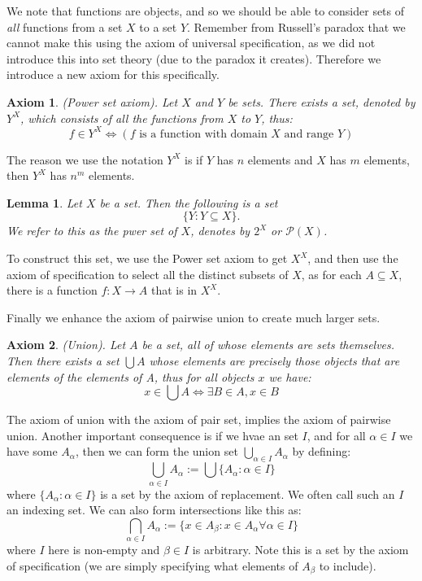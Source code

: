 \documentclass{article}
\newtheorem{axiom}{Axiom}[section]
\newtheorem{lemma}{Lemma}[subsection]
\let\it\textit
\begin{document}
We note that functions are objects, and so we should be able to consider 
sets of \it{all} functions from a set $X$ to a set $Y$. Remember 
from Russell's paradox that we cannot make this using the axiom 
of universal specification, as we did not introduce this into 
set theory (due to the paradox it creates). Therefore we introduce 
a new axiom for this specifically. 

\begin{axiom}
	(Power set axiom). Let $X$ and $Y$ be sets. There exists a set, 
	denoted by $Y^X$, which consists of all the functions from 
	$X$ to $Y$, thus: 
	$$
	f \in Y^X \iff (f \text{ is a function with domain } X 
	\text{ and range } Y)
	$$
\end{axiom}

The reason we use the notation $Y^X$ is if $Y$ has $n$ elements and $X$ has 
$m$ elements, then $Y^X$ has $n^m$ elements.

\begin{lemma}
	Let $X$ be a set. Then the following is a set 
	$$
	\{Y : Y \subseteq X \}.
	$$
	We refer to this as the pwer set of $X$, denotes by 
	$2^X$ or $\mathcal{P}(X)$.
\end{lemma}

To construct this set, we use the Power set axiom to get $X^X$, and then
use the axiom of specification to select all the distinct subsets of $X$, 
as for each $A \subseteq X$, there is a function $f: X \to A$ that is 
in $X^X$.

Finally we enhance the axiom of pairwise union to create much larger sets.

\begin{axiom}
	(Union). Let $A$ be a set, all of whose elements are sets themselves.
	Then there exists a set $\bigcup A$ whose elements 
	are precisely those objects that are elements of the elements of A, thus 
	for all objects $x$ we have: 
	$$
	x \in \bigcup A \iff \exists B \in A, x \in B
	$$
\end{axiom}

The axiom of union with the axiom of pair set, implies the axiom of pairwise
union. Another important consequence is if we hvae an set $I$, and for 
all $\alpha \in I$ we have some $A_\alpha$, then we can form the union 
set $\bigcup_{\alpha \in I} A_\alpha$ by defining: 
$$
\bigcup_{\alpha \in I} A_\alpha := \bigcup \{A_\alpha : \alpha \in I\}
$$
where $\{ A_\alpha : \alpha \in I\}$ is a set by the axiom of replacement. 
We often call such an $I$ an indexing set. We can also form intersections 
like this as: 
$$
\bigcap_{\alpha \in I} A_\alpha := \{x \in A_\beta : x\in A_\alpha \forall \alpha \in I\}
$$
where $I$ here is non-empty and $\beta \in I$ is arbitrary. Note this 
is a set by the axiom of specification (we are simply specifying what 
elements of $A_\beta$ to include).
\end{document}
